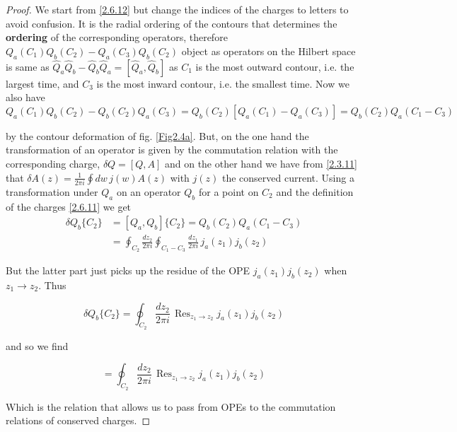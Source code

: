 \begin{tcolorbox}[breakable]
	\begin{proof}
		We start from \eqref{2.6.12} but change the indices of the charges to letters to avoid confusion. It is the radial ordering of the contours that determines the \textbf{ordering} of the corresponding operators, therefore \( Q_a(C_1)Q_b(C_2) - Q_a(C_3)Q_b(C_2) \) object as operators on the Hilbert space is same as \( \hat{Q}_a\hat{Q}_b - \hat{Q}_b\hat{Q}_a = [\hat{Q}_a, \hat{Q}_b] \) as \( C_1 \) is the most outward contour, i.e. the largest time, and \( C_3 \) is the most inward contour, i.e. the smallest time. Now we also have
		\begin{equation}
			Q_a(C_1)Q_b(C_2) - Q_b(C_2)Q_a(C_3) = Q_b(C_2)[Q_a(C_1) - Q_a(C_3)]
			= Q_b(C_2)Q_a(C_1 - C_3)
		\end{equation}
		
		by the contour deformation of fig. \ref{Fig2.4a}. But, on the one hand the transformation of an operator is given by the commutation relation with the corresponding charge, \( \delta Q = [Q, A] \) and on the other hand we have from \eqref{2.3.11} that \( \delta A(z) = \frac{1}{2\pi i} \oint dw \, j(w)A(z) \) with \( j(z) \) the conserved current. Using a transformation under \( Q_a \) on an operator \( Q_b \) for a point on \( C_2 \) and the definition of the charges \eqref{2.6.11} we get
		\begin{align*}
			\delta Q_b\{C_2\} &= [Q_a, Q_b]\{C_2\} = Q_b(C_2)Q_a(C_1 - C_3)\\
			&=\oint_{C_2} \frac{dz_2}{2\pi i} \oint_{C_1-C_3} \frac{dz_1}{2\pi i} \, j_a(z_1)j_b(z_2)
		\end{align*}
		
		But the latter part just picks up the residue of the OPE \( j_a(z_1)j_b(z_2) \) when \( z_1 \to z_2 \). Thus
		
		\begin{equation}
			\delta Q_b\{C_2\} = \oint_{C_2} \frac{dz_2}{2\pi i} \, \operatorname{Res}_{z_1 \to z_2} j_a(z_1)j_b(z_2)
		\end{equation}
		
		and so we find
		
		\begin{equation}
			[\hat{Q}_a, \hat{Q}_b] = \oint_{C_2} \frac{dz_2}{2\pi i} \, \operatorname{Res}_{z_1 \to z_2} j_a(z_1)j_b(z_2)
		\end{equation}
		
		Which is the relation that allows us to pass from OPEs to the commutation relations of conserved charges.
	\end{proof}
\end{tcolorbox}
